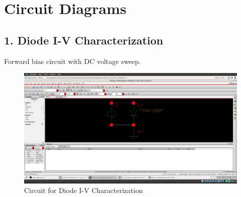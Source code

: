 \documentclass[12pt,a4paper]{article}
\begin{document}
\section*{Circuit Diagrams}
\subsection*{1. Diode I-V Characterization}
Forward bias circuit with DC voltage sweep.
\begin{figure}[H]
    \centering
    \includegraphics[width=\textwidth]{figs/Diode/Circuit.jpg} %
    \caption{Circuit for Diode I-V Characterization}
\end{figure}
\end{document}
